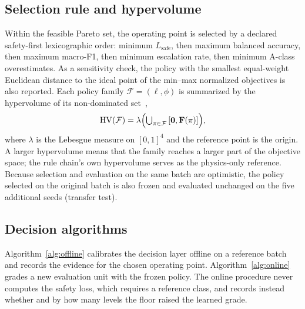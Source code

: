 \documentclass[journal]{IEEEtran}
\newcommand{\Lsafe}{L_{\mathrm{safe}}}
\begin{document}
\subsection{Selection rule and hypervolume}
\label{sec:selection}
Within the feasible Pareto set, the operating point is selected by a declared safety-first lexicographic order: minimum $\Lsafe$, then maximum balanced accuracy, then maximum macro-F1, then minimum escalation rate, then minimum A-class overestimates. As a sensitivity check, the policy with the smallest equal-weight Euclidean distance to the ideal point of the min--max normalized objectives is also reported. Each policy family $\mathcal F=(\ell,\phi)$ is summarized by the hypervolume of its non-dominated set~\cite{Zitzler1999,Zitzler2003},
\begin{equation}
\mathrm{HV}(\mathcal F)=\lambda\Bigl(\textstyle\bigcup_{\pi\in\mathcal F}\,[\mathbf 0,\mathbf F(\pi)]\Bigr),
\label{eq:hv}
\end{equation}
where $\lambda$ is the Lebesgue measure on $[0,1]^4$ and the reference point is the origin. A larger hypervolume means that the family reaches a larger part of the objective space; the rule chain's own hypervolume serves as the physics-only reference. Because selection and evaluation on the same batch are optimistic, the policy selected on the original batch is also frozen and evaluated unchanged on the five additional seeds (transfer test).

\subsection{Decision algorithms}
\label{sec:algorithms}
Algorithm~\ref{alg:offline} calibrates the decision layer offline on a reference batch and records the evidence for the chosen operating point. Algorithm~\ref{alg:online} grades a new evaluation unit with the frozen policy. The online procedure never computes the safety loss, which requires a reference class, and records instead whether and by how many levels the floor raised the learned grade.
\end{document}
